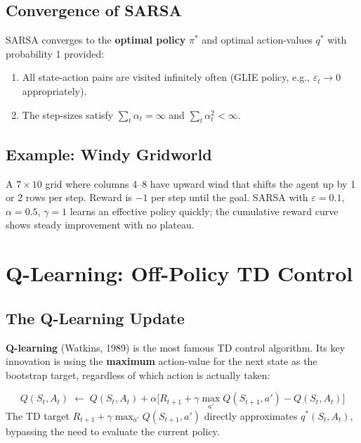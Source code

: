 \documentclass[11pt,a4paper]{article}
\theoremstyle{definition}
\theoremstyle{plain}
\theoremstyle{remark}
\begin{document}
\subsection{Convergence of SARSA}

\begin{tcolorbox}[colback=green!5!white, colframe=green!60!black, title={Convergence of SARSA}]
SARSA converges to the \textbf{optimal policy} $\pi^*$ and optimal action-values $q^*$ with probability 1 provided:
\begin{enumerate}
    \item All state-action pairs are visited infinitely often (GLIE policy, e.g., $\varepsilon_t \to 0$ appropriately).
    \item The step-sizes satisfy $\sum_t \alpha_t = \infty$ and $\sum_t \alpha_t^2 < \infty$.
\end{enumerate}
\end{tcolorbox}

\subsection{Example: Windy Gridworld}

A $7 \times 10$ grid where columns 4–8 have upward wind that shifts the agent up by 1 or 2 rows per step. Reward is $-1$ per step until the goal. SARSA with $\varepsilon = 0.1$, $\alpha = 0.5$, $\gamma = 1$ learns an effective policy quickly; the cumulative reward curve shows steady improvement with no plateau.

\section{Q-Learning: Off-Policy TD Control}

\subsection{The Q-Learning Update}

\textbf{Q-learning} (Watkins, 1989) is the most famous TD control algorithm. Its key innovation is using the \textbf{maximum} action-value for the next state as the bootstrap target, regardless of which action is actually taken:

\begin{tcolorbox}[colback=green!5!white, colframe=green!60!black, title={Q-Learning Update Rule}]
\[
    Q(S_t, A_t) \;\leftarrow\; Q(S_t, A_t) + \alpha\bigl[R_{t+1} + \gamma \max_{a'} Q(S_{t+1}, a') - Q(S_t, A_t)\bigr]
\]
The TD target $R_{t+1} + \gamma \max_{a'} Q(S_{t+1}, a')$ directly approximates $q^*(S_t, A_t)$, bypassing the need to evaluate the current policy.
\end{tcolorbox}
\end{document}
